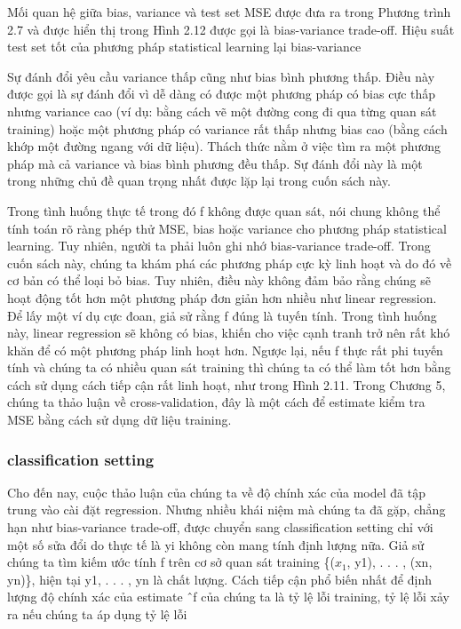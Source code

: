 Mối quan hệ giữa bias, variance và test set MSE được đưa ra trong Phương trình 2.7 và được hiển thị trong Hình 2.12 được gọi là bias-variance trade-off. Hiệu suất test set tốt của phương pháp statistical learning lại bias-variance

Sự đánh đổi yêu cầu variance thấp cũng như bias bình phương thấp. Điều này được gọi là sự đánh đổi vì dễ dàng có được một phương pháp có bias cực thấp nhưng variance cao (ví dụ: bằng cách vẽ một đường cong đi qua từng quan sát training) hoặc một phương pháp có variance rất thấp nhưng bias cao (bằng cách khớp một đường ngang với dữ liệu). Thách thức nằm ở việc tìm ra một phương pháp mà cả variance và bias bình phương đều thấp. Sự đánh đổi này là một trong những chủ đề quan trọng nhất được lặp lại trong cuốn sách này.

Trong tình huống thực tế trong đó f không được quan sát, nói chung không thể tính toán rõ ràng phép thử MSE, bias hoặc variance cho phương pháp statistical learning. Tuy nhiên, người ta phải luôn ghi nhớ bias-variance trade-off. Trong cuốn sách này, chúng ta khám phá các phương pháp cực kỳ linh hoạt và do đó về cơ bản có thể loại bỏ bias. Tuy nhiên, điều này không đảm bảo rằng chúng sẽ hoạt động tốt hơn một phương pháp đơn giản hơn nhiều như linear regression. Để lấy một ví dụ cực đoan, giả sử rằng f đúng là tuyến tính. Trong tình huống này, linear regression sẽ không có bias, khiến cho việc cạnh tranh trở nên rất khó khăn để có một phương pháp linh hoạt hơn. Ngược lại, nếu f thực rất phi tuyến tính và chúng ta có nhiều quan sát training thì chúng ta có thể làm tốt hơn bằng cách sử dụng cách tiếp cận rất linh hoạt, như trong Hình 2.11. Trong Chương 5, chúng ta thảo luận về cross-validation, đây là một cách để estimate kiểm tra MSE bằng cách sử dụng dữ liệu training.

\subsubsection{classification setting}

Cho đến nay, cuộc thảo luận của chúng ta về độ chính xác của model đã tập trung vào cài đặt regression. Nhưng nhiều khái niệm mà chúng ta đã gặp, chẳng hạn như bias-variance trade-off, được chuyển sang classification setting chỉ với một số sửa đổi do thực tế là yi không còn mang tính định lượng nữa. Giả sử chúng ta tìm kiếm ước tính f trên cơ sở quan sát training \{($x_{1}$, y1), . . . , (xn, yn)\}, hiện tại y1, . . . , yn là chất lượng. Cách tiếp cận phổ biến nhất để định lượng độ chính xác của estimate ˆf của chúng ta là tỷ lệ lỗi training, tỷ lệ lỗi xảy ra nếu chúng ta áp dụng tỷ lệ lỗi

